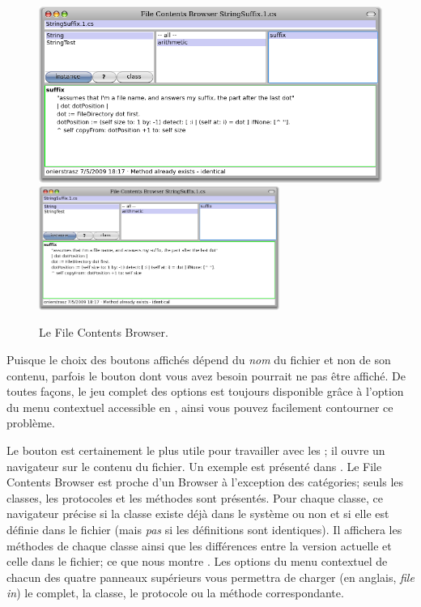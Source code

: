 \documentclass[a4paper,10pt,twoside]{book}
\begin{document}
\begin{figure}[btp]
	\begin{center}
	\ifluluelse
		{\includegraphics[width=\textwidth]{fileContentsBrowser}}
		{\includegraphics[width=0.7\textwidth]{fileContentsBrowser}}
	\end{center}
	\caption{Le File Contents Browser.}
\end{figure}

Puisque le choix des boutons affichés dépend du \emph{nom} du fichier et
non de son contenu, parfois le bouton dont vous avez besoin pourrait ne pas être
affiché.
De toutes façons, le jeu complet des options est toujours disponible grâce
à l'option  du menu contextuel accessible en \actclickant,
ainsi vous pouvez facilement contourner ce problème.

Le bouton  est certainement le plus utile pour travailler avec les \changesets;
il ouvre un navigateur sur le contenu du fichier. Un exemple est présenté dans
.
Le File Contents Browser est proche d'un Browser à l'exception
des catégories; seuls les classes, les protocoles et les méthodes sont présentés.
Pour chaque classe, ce navigateur précise si la classe existe déjà dans
le système ou non et si elle est définie dans le fichier (mais \emph{pas} si
les définitions sont identiques).
Il affichera les méthodes de chaque classe
ainsi que les différences entre la version actuelle et celle dans le fichier; ce que
nous montre .
Les options du menu contextuel de chacun des quatre panneaux supérieurs vous
permettra de charger (en anglais, \emph{file in}) le \changeset complet, la classe, 
le protocole ou la méthode correspondante.
\end{document}
